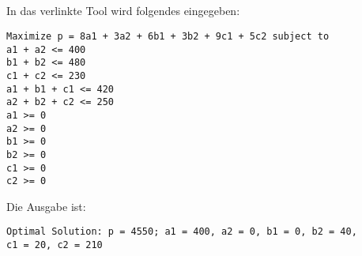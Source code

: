 \documentclass[10pt,a4paper,oneside,ngerman,numbers=noenddot]{scrartcl}
\begin{document}
	\subsection{} %
		In das verlinkte Tool wird folgendes eingegeben:
\begin{verbatim}
Maximize p = 8a1 + 3a2 + 6b1 + 3b2 + 9c1 + 5c2 subject to
a1 + a2 <= 400
b1 + b2 <= 480
c1 + c2 <= 230
a1 + b1 + c1 <= 420
a2 + b2 + c2 <= 250
a1 >= 0
a2 >= 0
b1 >= 0
b2 >= 0
c1 >= 0
c2 >= 0
\end{verbatim}
	Die Ausgabe ist:
\begin{verbatim}
Optimal Solution: p = 4550; a1 = 400, a2 = 0, b1 = 0, b2 = 40, 
c1 = 20, c2 = 210
\end{verbatim}
\end{document}
